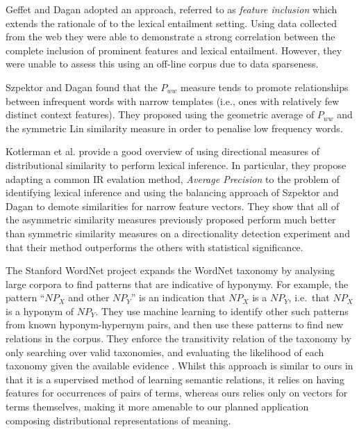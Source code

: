 \documentclass[11pt]{article}
\begin{document}
Geffet and Dagan  adopted an approach, referred to as \emph{feature inclusion} which extends the rationale of  to the lexical entailment setting.    Using data collected from the web they were able to demonstrate a strong correlation between the complete inclusion of prominent features and lexical entailment.  However, they were unable to assess this using an off-line corpus due to data sparseness.

Szpektor and Dagan  found that the $P_{ww}$ measure tends to promote relationships between infrequent words with narrow templates (i.e., ones with relatively few distinct context features).  They proposed using the geometric average of $P_{ww}$ and the symmetric Lin similarity measure in order to penalise low frequency words.   

Kotlerman et al.  provide a good overview of using directional measures of distributional similarity to perform lexical inference.  In particular, they propose adapting a common IR evalation method, \emph{Average Precision} to the problem of identifying lexical inference and using the balancing approach of Szpektor and Dagan  to demote similarities for narrow feature vectors.  They show that all of the asymmetric similarity measures previously proposed perform much better than symmetric similarity measures on a directionality detection experiment and that their method outperforms the others with statistical significance.

The Stanford WordNet project \cite{Snow:04} expands the WordNet
taxonomy by analysing large corpora to find patterns that are
indicative of hyponymy. For example, the pattern ``$\mathit{NP}_X$ and
other $\mathit{NP}_Y$'' is an indication that $\mathit{NP}_X$ is a
$\mathit{NP}_Y$, i.e.~that $\mathit{NP}_X$ is a hyponym of
$\mathit{NP}_Y$. They use machine learning to identify other such
patterns from known hyponym-hypernym pairs, and then use these
patterns to find new relations in the corpus. They enforce the
transitivity relation of the taxonomy by only searching over valid
taxonomies, and evaluating the likelihood of each taxonomy given the
available evidence \cite{Snow:06}. Whilst this approach is similar to
ours in that it is a supervised method of learning semantic relations,
it relies on having features for occurrences of pairs of terms,
whereas ours relies only on vectors for terms themselves, making it
more amenable to our planned application composing distributional
representations of meaning.
\end{document}
